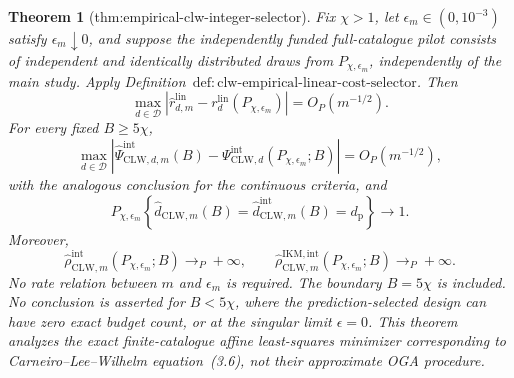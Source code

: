 \documentclass{article}
\newtheorem{theorem}{Theorem}
\begin{document}
\begin{theorem}[thm:empirical-clw-integer-selector]\label{thm:empirical-clw-integer-selector}
Fix \(\chi>1\), let \(\epsilon_m\in(0,10^{-3})\) satisfy \(\epsilon_m\downarrow0\), and suppose the independently funded full-catalogue pilot consists of independent and identically distributed draws from \(P_{\chi,\epsilon_m}\), independently of the main study.  Apply Definition~\(\mathrm{def{:}clw\text{-}empirical\text{-}linear\text{-}cost\text{-}selector}\).  Then
\[
 \max_{d\in\mathcal D}
 \left|\widehat r_{d,m}^{\mathrm{lin}}
 -r_d^{\mathrm{lin}}(P_{\chi,\epsilon_m})\right|
 =O_P(m^{-1/2}).                                           \tag{1}
\]
For every fixed \(B\ge5\chi\),
\[
 \max_{d\in\mathcal D}
 \left|\widehat\Psi_{\mathrm{CLW},d,m}^{\mathrm{int}}(B)
 -\Psi_{\mathrm{CLW},d}^{\mathrm{int}}(P_{\chi,\epsilon_m};B)\right|
 =O_P(m^{-1/2}),                                           \tag{2}
\]
with the analogous conclusion for the continuous criteria, and
\[
 P_{\chi,\epsilon_m}\!\left\{
 \widehat d_{\mathrm{CLW},m}(B)
 =\widehat d_{\mathrm{CLW},m}^{\mathrm{int}}(B)
 =d_{\mathrm p}\right\}\longrightarrow1.                \tag{3}
\]
Moreover,
\[
 \widehat\rho_{\mathrm{CLW},m}^{\mathrm{int}}
 (P_{\chi,\epsilon_m};B)\longrightarrow_P+\infty,
 \qquad
 \widehat\rho_{\mathrm{CLW},m}^{\mathrm{IKM,int}}
 (P_{\chi,\epsilon_m};B)\longrightarrow_P+\infty.       \tag{4}
\]
No rate relation between \(m\) and \(\epsilon_m\) is required.  The boundary \(B=5\chi\) is included.  No conclusion is asserted for \(B<5\chi\), where the prediction-selected design can have zero exact budget count, or at the singular limit \(\epsilon=0\).  This theorem analyzes the exact finite-catalogue affine least-squares minimizer corresponding to Carneiro--Lee--Wilhelm equation~(3.6), not their approximate OGA procedure.
\end{theorem}
\end{document}
